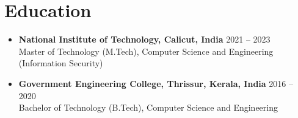 \section*{Education}
\begin{itemize}[leftmargin=0.5cm]
    \item \textbf{National Institute of Technology, Calicut, India} \hfill 2021 -- 2023 \\
          Master of Technology (M.Tech), Computer Science and Engineering (Information Security)
    \item \textbf{Government Engineering College, Thrissur, Kerala, India} \hfill 2016 -- 2020 \\
          Bachelor of Technology (B.Tech), Computer Science and Engineering
\end{itemize}